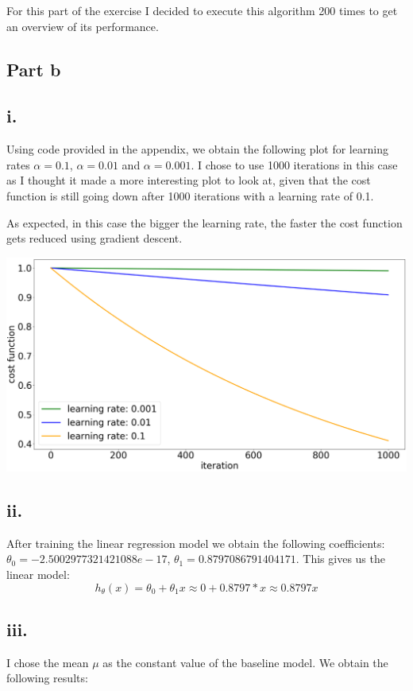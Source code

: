 \documentclass[10pt]{article}
\begin{document}
For this part of the exercise I decided to execute this algorithm 200 times to get an overview of its performance.

\subsection*{Part b}
\subsection*{i.}
Using code provided in the appendix, we obtain the following plot for
learning rates $\alpha = 0.1$, $\alpha = 0.01$ and $\alpha = 0.001$.
I chose to use 1000 iterations in this case as I thought it made a more
interesting plot to look at, given that the cost function is still going down after
1000 iterations with a learning rate of 0.1.

As expected, in this case the bigger the learning rate, the faster the cost function
gets reduced using gradient descent.


\vspace{5mm} %
\includegraphics[scale=0.23]{Figure_1.png}

\subsection*{ii.}
After training the linear regression model we obtain the following coefficients:
$\theta_{0} = -2.5002977321421088e-17$, $\theta_{1} = 0.8797086791404171$. 
This gives us the linear model:
\begin{equation*}
    h_{\theta}(x) = \theta_{0} + \theta_{1}x \approx 0 + 0.8797 * x \approx 0.8797x
\end{equation*}

\subsection*{iii.}
I chose the mean $\mu$ as the constant value of the baseline model.
We obtain the following results:
\end{document}

